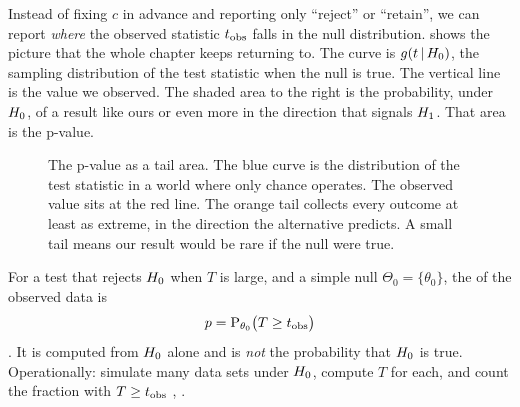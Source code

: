 Instead of fixing $c$ in advance and reporting only ``reject'' or ``retain'',
we can report \emph{where} the observed statistic $t_{\rm obs}$ falls in the
null distribution.  shows the picture that the whole
chapter keeps returning to. The curve is $g(t\,\vert\,H_0)$, the sampling
distribution of the test statistic when the null is true. The vertical line is
the value we observed. The shaded area to the right is the probability,
under $H_0$, of a result like ours or even more in the direction that
signals $H_1$. That area is the p-value.

\begin{figure}[htbp]
\centering
{}
\caption{The p-value as a tail area. The blue curve is the distribution of the
test statistic in a world where only chance operates. The observed value sits
at the red line. The orange tail collects every outcome at least as extreme,
in the direction the alternative predicts. A small tail means our result would
be rare if the null were true.}
\label{4a:fig:null-tail}
\end{figure}

\begin{workdef}[p-value]
For a test that rejects $H_0$ when $T$ is large, and a simple null
$\Theta_0=\{\theta_0\}$, the  of the observed data is
\[
  p=\operatorname{P}_{\theta_0}\bigl(T\ge t_{\rm obs}\bigr)
\]
. It is computed from
$H_0$ alone and is \emph{not} the probability that $H_0$ is true.
Operationally: simulate many data sets under $H_0$, compute $T$ for each,
and count the fraction with $T\ge t_{\rm obs}$
, .
\end{workdef}

